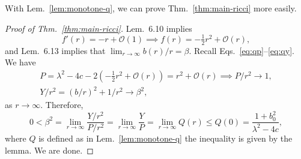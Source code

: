 \documentclass[11pt,letterpaper]{article}
\begin{document}
With Lem.~\ref{lem:monotone-q}, we can prove Thm.~\ref{thm:main-ricci} more easily.

\begin{proof}[Proof of Thm.~\ref{thm:main-ricci}]
    Lem.~6.10 \cite{Rajan} implies
    \begin{equation}
        f'(r) = -r + \mathcal O(1) \implies f(r) = -\tfrac12 r^2 + \mathcal O(r),
    \end{equation}
    and Lem.~6.13 implies that $\lim_{r \to \infty} b(r) / r = \beta$. Recall Eqs.~\eqref{eq:qp}--\eqref{eq:qy}. We have
    \begin{gather}
        P = \lambda^2 - 4c - 2 (-\tfrac12 r^2 + \mathcal O(r)) = r^2 + \mathcal O(r) \implies P/r^2 \to 1, \\
        Y/r^2 = (b/r)^2 + 1/r^2 \to \beta^2,
    \end{gather}
    as $r \to \infty$. Therefore,
    \begin{equation}
        0 < \beta^2 = \lim_{r \to \infty} \frac{Y/r^2}{P/r^2} = \lim_{r \to \infty} \frac YP = \lim_{r \to \infty} Q(r) \le Q(0) = \frac{1 + b_0^2}{\lambda^2 - 4c},
    \end{equation}
    where $Q$ is defined as in Lem.~\ref{lem:monotone-q} the inequality is given by the lemma. We are done.
\end{proof}

\printbibliography
\end{document}

